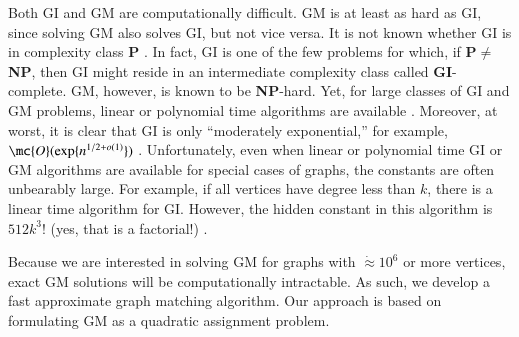 \documentclass[preprint,11pt]{elsarticle}
\begin{document}
Both GI and GM are computationally difficult. GM is at least as hard as GI, since solving GM also solves GI, but not vice versa. It is not known whether GI is in complexity class \textbf{P} \cite{Fortin1996}.  In fact, GI is one of the few problems for which, if \textbf{P}$\neq$\textbf{NP}, then GI might reside in an intermediate complexity class called \textbf{GI}-complete.  GM, however, is known to be \textbf{NP}-hard.    
Yet, for large classes of GI and GM problems, linear or polynomial time algorithms are available \cite{Babai1980}.  Moreover, at worst, it is clear that GI is only ``moderately exponential,'' for example, $\mc{O}(\exp\{n^{1/2 + o(1)}\})$ \cite{Babai1981}.  Unfortunately, even when linear or polynomial time GI or GM algorithms are available for special cases of graphs, the constants are often unbearably large.  For example, if all vertices have degree less than $k$, there is a linear time algorithm for GI.  However, the hidden constant in this algorithm is $512k^3!$ (yes, that is a factorial!) \cite{Chen1994}.  

Because we are interested in solving GM for graphs with $\dot{\approx} 10^6$ or more vertices, exact GM solutions will be computationally intractable. As such, we develop a fast approximate graph matching algorithm.   Our approach is based on formulating GM as a quadratic assignment problem.  %




\end{document}
